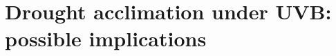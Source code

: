 \documentclass[10pt]{beamer}\usepackage[]{graphicx}\usepackage[]{color}
\begin{document}
%


\section[Drought acclimation under UVB: possible implications]{Drought acclimation under UVB:\\ possible implications}
\end{document}
